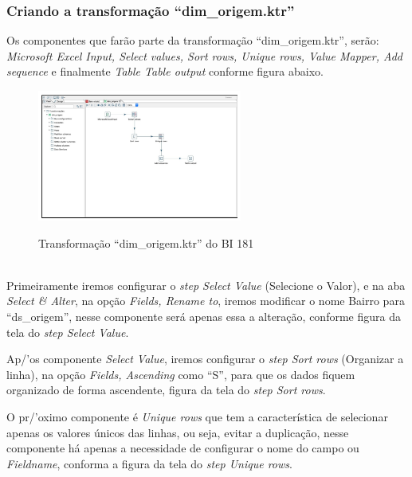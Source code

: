 \subsubsection{Criando a transforma\c{c}\~{a}o ``dim\_origem.ktr''}

Os componentes que far\~{a}o parte da transforma\c{c}\~{a}o ``dim\_origem.ktr'', ser\~{a}o: \textit{Microsoft Excel Input, Select values, Sort rows, Unique rows, Value Mapper, Add sequence} e finalmente \textit{Table Table output} conforme figura abaixo. 

\begin{figure}[H]
	\vspace*{0,2cm}
    \centering
    \caption{Transforma\c{c}\~{a}o ``dim\_origem.ktr'' do BI 181}
    \includegraphics[width=0.6\textwidth]{./04-figuras/figura-dim-origem}
    \label{fig:ilustfigrdimorigem}
\end{figure}
\vspace*{-0,9cm}
{\raggedright {}} \\

Primeiramente iremos configurar o \textit{step Select Value} (Selecione o Valor), e na aba \textit{Select & Alter}, na op\c{c}\~{a}o \textit{Fields, Rename to}, iremos modificar o nome Bairro para ``ds\_origem'', nesse componente ser\'{a} apenas essa a altera\c{c}\~{a}o, conforme figura da tela do \textit{step Select Value}.

Ap/'{o}s componente \textit{Select Value}, iremos configurar o \textit{step Sort rows} (Organizar a linha), na op\c{c}\~{a}o \textit{Fields, Ascending} como ``S'', para que os dados fiquem organizado de forma ascendente, figura da tela do \textit{step Sort rows}.

O pr/'{o}ximo componente \'{e} \textit{Unique rows} que tem a caracter\'{i}stica de selecionar apenas os valores únicos das linhas, ou seja, evitar a duplica\c{c}\~{a}o, nesse componente h\'{a} apenas a necessidade de configurar o nome do campo ou \textit{Fieldname}, conforma a figura da tela do \textit{step Unique rows}.

